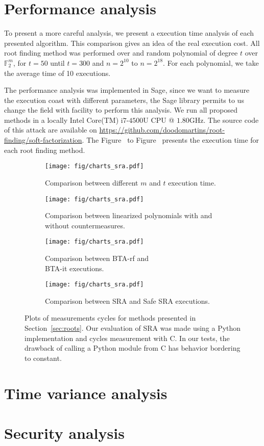 \section{Performance analysis}
To present a more careful analysis, we present a execution time analysis of each presented algorithm. This comparison gives an idea of the real execution cost. All root finding method was performed over and random polynomial of degree $t$ over $\mathbb{F}_2^m$, for $t = 50$ until $t = 300$ and $n = 2^10$ to $n = 2^{18}$. For each polynomial, we take the average time of 10 executions.
 
The performance analysis was implemented in Sage\cite{sage}, since we want to measure the execution coast with different parameters, the Sage library permits to us change the field with facility to perform this analysis. We run all proposed methods in a locally Intel\textsuperscript{\tiny\textregistered} Core(TM) i$7$-$4500$U CPU @ $1.80$GHz. The source code of this attack are available on \url{https://github.com/doodomartins/root-finding/soft-factorization}. The Figure~\label{} to Figure~\label{} presents the execution time for each root finding method.


\begin{figure}[!ht]
\begin{subfigure}{0.5\textwidth}
  \centering
  \texttt{[image: fig/charts\_sra.pdf]}
  \caption{Comparison between different $m$ and $t$ execution time.}
  \label{fig:sexha}
\end{subfigure}
\begin{subfigure}{0.5\textwidth}
  \centering
  \texttt{[image: fig/charts\_sra.pdf]}
  \caption{Comparison between linearized polynomials with and without countermeasures.}
  \label{fig:slin}
\end{subfigure}
\begin{subfigure}{0.5\textwidth}
  \centering
  \texttt{[image: fig/charts\_sra.pdf]}
  \caption{Comparison between BTA-rf and \\BTA-it executions.}
  \label{fig:sbta}
\end{subfigure}%
\begin{subfigure}{0.5\textwidth}
  \centering
  \texttt{[image: fig/charts\_sra.pdf]}
  \caption{Comparison between SRA and Safe SRA executions.}
  \label{fig:ssra}
\end{subfigure}%
\caption{Plots of measurements cycles for methods presented in Section~\ref{sec:roots}. Our evaluation of SRA was made using a Python implementation and cycles measurement with C. In our tests, the drawback of calling a Python module from C has behavior bordering to constant.}
\label{fig:graph}
\end{figure}
 
\section{Time variance analysis}
\section{Security analysis}